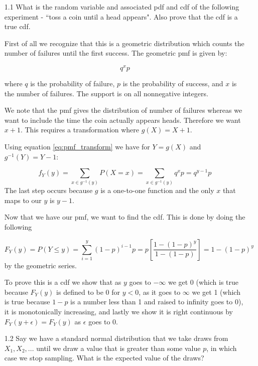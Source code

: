 \begin{enumerate}

\item[1.1] What is the random variable and associated pdf and cdf of the following experiment - ``toss a coin until a head appears". Also prove that the cdf is a true cdf.

First of all we recognize that this is a geometric distribution which counts the number of failures until the first success. The geometric pmf is given by:

\begin{equation}
q^{x}p
\end{equation}

\noindent where $q$ is the probability of failure, $p$ is the probability of success, and $x$ is the number of failures. The support is on all nonnegative integers. 

We note that the pmf gives the distribution of number of failures whereas we want to include the time the coin actually appears heads. Therefore we want $x+1$. This requires a transformation where $g(X) = X + 1$.

Using equation \ref{eq:pmf_transform} we have for $Y=g(X)$ and $g^{-1}(Y) = Y - 1$:

\begin{equation}
f_Y(y) = \sum_{x \in g^{-1}(y)} P(X = x) = \sum_{x \in g^{-1}(y)} q^{x}p = q^{y-1} p
\end{equation}
\noindent The last step occurs because $g$ is a one-to-one function and the only $x$ that maps to our $y$ is $y-1$. 

Now that we have our pmf, we want to find the cdf. This is done by doing the following

\begin{equation}
F_Y(y) = P(Y \leq y ) = \sum_{i=1}^{y} (1-p)^{i-1}p  = p \left [ \frac{1 - (1-p)^y}{1 - (1-p)} \right ] = 1 - (1-p)^y
\end{equation}
\noindent by the geometric series.

To prove this is a cdf we show that as $y$ goes to $-\infty$ we get 0 (which is true because $F_Y(y)$ is defined to be 0 for $y<0$, as it goes to $\infty$ we get 1 (which is true because $1-p$ is a number less than 1 and raised to infinity goes to 0), it is monotonically increasing, and lastly we show it is right continuous by $F_Y(y+\epsilon) = F_Y(y)$ as $\epsilon$ goes to 0. 



\item[1.2] Say we have a standard normal distribution that we take draws from $X_1, X_2, ...$ until we draw a value that is greater than some value $p$, in which case we stop sampling. What is the expected value of the draws?


\end{enumerate}
